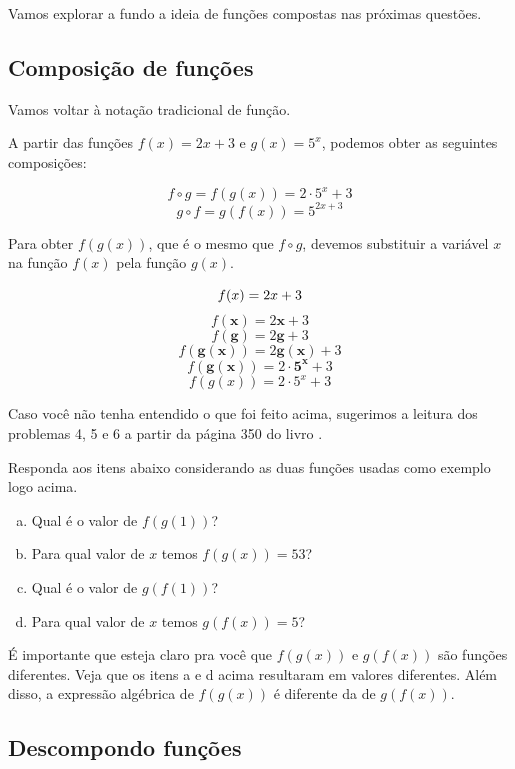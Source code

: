 \documentclass[main_estudante.tex]{subfiles}
\begin{document}
Vamos explorar a fundo a ideia de funções compostas nas próximas questões.

\subsection*{Composição de funções}

Vamos voltar à notação tradicional de função.

\begin{shaded*}
A partir das funções $f(x)=2x+3$ e $g(x)=5^x$, podemos obter as seguintes composições:

$$ f \circ g = f(g(x)) = 2 \cdot 5^x + 3 $$
$$ g \circ f = g(f(x)) = 5^{2x+3}$$
\end{shaded*}

Para obter $f(g(x))$, que é o mesmo que $f \circ g$, devemos substituir a variável $x$ na função $f(x)$ pela função $g(x)$.

$$ f(x)=2x+3 \newline $$
$$ f(\mathbf{x})=2 \mathbf{x}+3  $$
$$ f(\mathbf{g})=2 \mathbf{g}+3  $$
$$ f(\mathbf{g(x)})=2 \mathbf{g(x)}+3  $$
$$ f(\mathbf{g(x)})=2 \cdot \mathbf{5^x}+3  $$
$$f(g(x))=2 \cdot 5^x+3  $$

Caso você não tenha entendido o que foi feito acima, sugerimos a leitura dos problemas 4, 5 e 6 a partir da página 350 do livro .

\begin{questao}
Responda aos itens abaixo considerando as duas funções usadas como exemplo logo acima.
\begin{enumerate}[a)]
\item Qual é o valor de $f(g(1))$?
\item Para qual valor de $x$ temos $f(g(x))=53$?
\item Qual é o valor de $g(f(1))$?
\item Para qual valor de $x$ temos $g(f(x))=5$?
\end{enumerate}
\end{questao}

É importante que esteja claro pra você que $f(g(x))$ e $g(f(x))$ são funções diferentes. Veja que os itens a e d acima resultaram em valores diferentes. Além disso, a expressão algébrica de $f(g(x))$ é diferente da de $g(f(x))$.

\subsection*{Descompondo funções}
\end{document}
